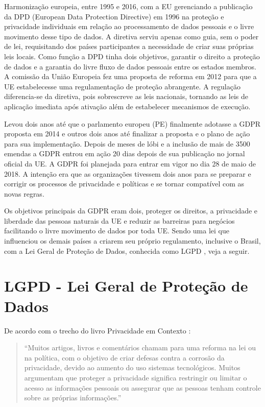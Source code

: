 Harmonização europeia, entre 1995 e 2016, com a EU gerenciando a publicação da DPD (European Data Protection Directive) em 1996 na proteção e privacidade individuais em relação ao processamento de dados pessoais e o livre movimento desse tipo de dados. A diretiva serviu apenas como guia, sem o poder de lei, requisitando dos países participantes a necessidade de criar suas próprias leis locais. Como função a DPD tinha dois objetivos, garantir o direito a proteção de dados e a garantia do livre fluxo de dados pessoais entre os estados membros. A comissão da União Europeia fez uma proposta de reforma em 2012 para que a UE estabelecesse uma regulamentação de proteção abrangente. A regulação diferencia-se da diretiva, pois sobrescreve as leis nacionais, tornando as leis de aplicação imediata após ativação além de estabelecer mecanismos de execução.

Levou dois anos até que o parlamento europeu (PE) finalmente adotasse a GDPR proposta em 2014 e outros dois anos até finalizar a proposta e o plano de ação para sua implementação. Depois de meses de lóbi e a inclusão de mais de 3500 emendas a GDPR entrou em ação 20 dias depois de sua publicação no jornal oficial da UE. A GDPR foi planejada para entrar em vigor no dia 28 de maio de 2018. A intenção era que as organizações tivessem dois anos para se preparar e corrigir os processos de privacidade e políticas e se tornar compatível com as novas regras.

Os objetivos principais da GDPR eram dois, proteger os direitos, a privacidade e liberdade das pessoas naturais da UE e reduzir as barreiras para negócios facilitando o livre movimento de dados por toda UE. Sendo uma lei que influenciou os demais países a criarem seu próprio regulamento, inclusive o Brasil, com a Lei Geral de Proteção de Dados, conhecida como LGPD \citep{candido_historico_2021}, veja a seguir. 


\section{LGPD - Lei Geral de Proteção de Dados}

De acordo com o trecho do livro Privacidade em Contexto \citep{Nissenbaum+2009}:

\begin{quote}
``Muitos artigos, livros e comentários chamam para uma reforma na lei ou na política, com o objetivo de criar defesas contra a corrosão da privacidade, devido ao aumento do uso sistemas tecnológicos. Muitos argumentam que proteger a privacidade significa restringir ou limitar o acesso as informações pessoais ou assegurar que as pessoas tenham controle sobre as próprias informações.'' 
\end{quote} 


